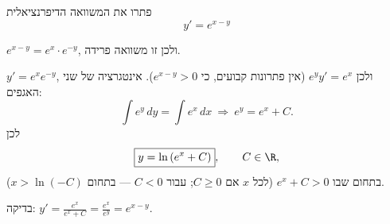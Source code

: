 
\begin{question}
פתרו את המשוואה הדיפרנציאלית
\[ y'=e^{x-y} \]
\end{question}

\begin{hint}
$e^{x-y}=e^x\cdot e^{-y}$, ולכן זו משוואה פרידה.
\end{hint}

\begin{solution}
$y'=e^x e^{-y}$, ולכן $e^{y}y'=e^x$ (אין פתרונות קבועים, כי $e^{x-y}>0$). אינטגרציה של שני האגפים:
\[ \int e^y\,dy=\int e^x\,dx\ \Longrightarrow\ e^y=e^x+C. \]
לכן
\[ \boxed{y=\ln\left(e^x+C\right)},\qquad C\in\R, \]
בתחום שבו $e^x+C>0$ (לכל $x$ אם $C\ge0$; עבור $C<0$ — בתחום $x>\ln(-C)$).

בדיקה: $y'=\frac{e^x}{e^x+C}=\frac{e^x}{e^y}=e^{x-y}$.
\end{solution}

